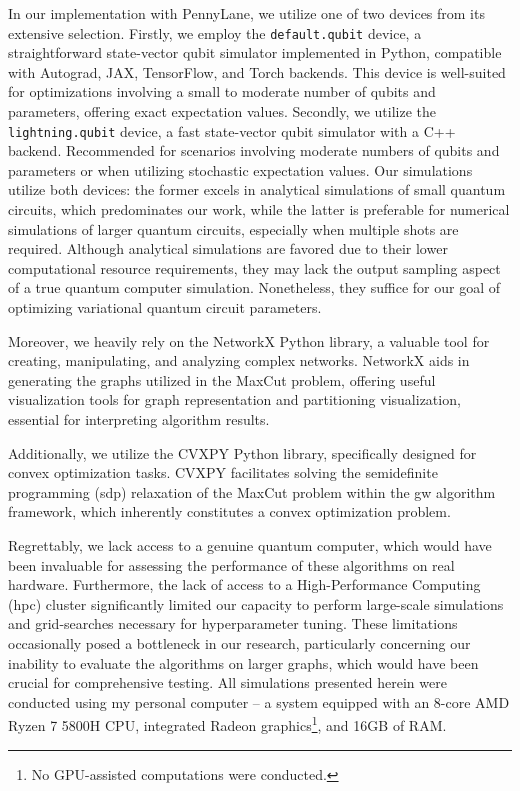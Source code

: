 In our implementation with PennyLane, we utilize one of two devices from its extensive selection. Firstly, we employ the \texttt{default.qubit} device, a straightforward state-vector qubit simulator implemented in Python, compatible with Autograd, JAX, TensorFlow, and Torch backends. This device is well-suited for optimizations involving a small to moderate number of qubits and parameters, offering exact expectation values. Secondly, we utilize the \texttt{lightning.qubit} device, a fast state-vector qubit simulator with a C++ backend. Recommended for scenarios involving moderate numbers of qubits and parameters or when utilizing stochastic expectation values. Our simulations utilize both devices: the former excels in analytical simulations of small quantum circuits, which predominates our work, while the latter is preferable for numerical simulations of larger quantum circuits, especially when multiple shots are required. Although analytical simulations are favored due to their lower computational resource requirements, they may lack the output sampling aspect of a true quantum computer simulation. Nonetheless, they suffice for our goal of optimizing variational quantum circuit parameters.

Moreover, we heavily rely on the NetworkX \cite{NetworkX} Python library, a valuable tool for creating, manipulating, and analyzing complex networks. NetworkX aids in generating the graphs utilized in the MaxCut problem, offering useful visualization tools for graph representation and partitioning visualization, essential for interpreting algorithm results.

Additionally, we utilize the CVXPY \cite{cvxpy} Python library, specifically designed for convex optimization tasks. CVXPY facilitates solving the semidefinite programming (\acrshort{sdp}) relaxation of the MaxCut problem within the \acrshort{gw} algorithm framework, which inherently constitutes a convex optimization problem.

Regrettably, we lack access to a genuine quantum computer, which would have been invaluable for assessing the performance of these algorithms on real hardware. Furthermore, the lack of access to a High-Performance Computing (\acrshort{hpc}) cluster significantly limited our capacity to perform large-scale simulations and grid-searches necessary for hyperparameter tuning. These limitations occasionally posed a bottleneck in our research, particularly concerning our inability to evaluate the algorithms on larger graphs, which would have been crucial for comprehensive testing. All simulations presented herein were conducted using my personal computer – a system equipped with an 8-core AMD Ryzen 7 5800H CPU, integrated Radeon graphics\footnote{No GPU-assisted computations were conducted.}, and 16GB of RAM.

